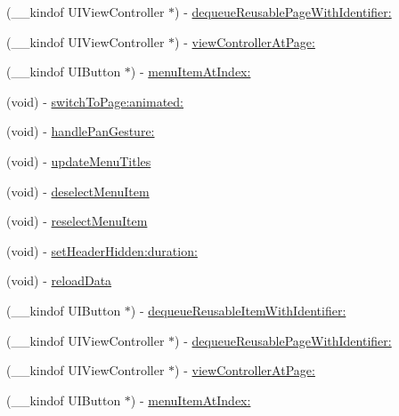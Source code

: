 \begin{DoxyCompactItemize}
\item 
(\+\_\+\+\_\+kindof U\+I\+View\+Controller $\ast$) -\/ \mbox{\hyperlink{interface_v_t_magic_view_a55eb4a83b49a1689761adba0d2596685}{dequeue\+Reusable\+Page\+With\+Identifier\+:}}
\item 
(\+\_\+\+\_\+kindof U\+I\+View\+Controller $\ast$) -\/ \mbox{\hyperlink{interface_v_t_magic_view_a16cb24e200dbf6952b217af4fd4e938e}{view\+Controller\+At\+Page\+:}}
\item 
(\+\_\+\+\_\+kindof U\+I\+Button $\ast$) -\/ \mbox{\hyperlink{interface_v_t_magic_view_a865a894c24bdce6783fd3bd8d9152400}{menu\+Item\+At\+Index\+:}}
\item 
(void) -\/ \mbox{\hyperlink{interface_v_t_magic_view_a419f8745d0c6afd26f97b782a643426e}{switch\+To\+Page\+:animated\+:}}
\item 
(void) -\/ \mbox{\hyperlink{interface_v_t_magic_view_a3c17ac83f0b9c1bf684852d60d3f4766}{handle\+Pan\+Gesture\+:}}
\item 
(void) -\/ \mbox{\hyperlink{interface_v_t_magic_view_a87cfe336988bf4d06aa52c3e1bbef132}{update\+Menu\+Titles}}
\item 
(void) -\/ \mbox{\hyperlink{interface_v_t_magic_view_a0e92cac6b3957cfc432779b9e9fd953f}{deselect\+Menu\+Item}}
\item 
(void) -\/ \mbox{\hyperlink{interface_v_t_magic_view_afd5ddee2cccae141176cd44b737f9444}{reselect\+Menu\+Item}}
\item 
(void) -\/ \mbox{\hyperlink{interface_v_t_magic_view_ac8808d94ff7db43424b201f33935c488}{set\+Header\+Hidden\+:duration\+:}}
\item 
(void) -\/ \mbox{\hyperlink{interface_v_t_magic_view_a2b4be574c1455324b75320267d6a570b}{reload\+Data}}
\item 
(\+\_\+\+\_\+kindof U\+I\+Button $\ast$) -\/ \mbox{\hyperlink{interface_v_t_magic_view_a53dd4f1868c19fcc9a8fcce1cefb41f8}{dequeue\+Reusable\+Item\+With\+Identifier\+:}}
\item 
(\+\_\+\+\_\+kindof U\+I\+View\+Controller $\ast$) -\/ \mbox{\hyperlink{interface_v_t_magic_view_a55eb4a83b49a1689761adba0d2596685}{dequeue\+Reusable\+Page\+With\+Identifier\+:}}
\item 
(\+\_\+\+\_\+kindof U\+I\+View\+Controller $\ast$) -\/ \mbox{\hyperlink{interface_v_t_magic_view_a16cb24e200dbf6952b217af4fd4e938e}{view\+Controller\+At\+Page\+:}}
\item 
(\+\_\+\+\_\+kindof U\+I\+Button $\ast$) -\/ \mbox{\hyperlink{interface_v_t_magic_view_a865a894c24bdce6783fd3bd8d9152400}{menu\+Item\+At\+Index\+:}}

\end{DoxyCompactItemize}
